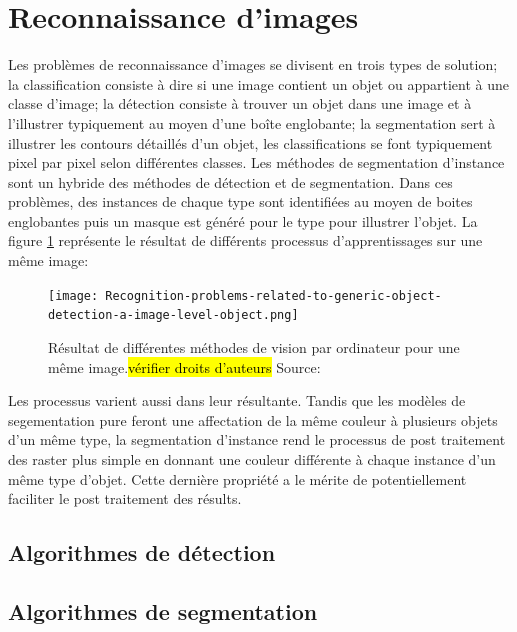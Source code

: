 \section{Reconnaissance d'images}
Les problèmes de reconnaissance d'images se divisent en trois types de solution; la classification consiste à dire si une image contient un objet ou appartient à une classe d'image; la détection consiste à trouver un objet dans une image et à l'illustrer typiquement au moyen d'une boîte englobante; la segmentation sert à illustrer les contours détaillés d'un objet, les classifications se font typiquement pixel par pixel selon différentes classes. Les méthodes de segmentation d'instance sont un hybride des méthodes de détection et de segmentation. Dans ces problèmes, des instances de chaque type sont identifiées au moyen de boites englobantes puis un masque est généré pour le type pour illustrer l'objet. La figure \ref{fig:computer_vision_problems} représente le résultat de différents processus d'apprentissages sur une même image:

\begin{figure}
  \centering
  \texttt{[image: Recognition-problems-related-to-generic-object-detection-a-image-level-object.png]}
  \caption{Résultat de différentes méthodes de vision par ordinateur pour une même image.\hl{vérifier droits d'auteurs} Source: \cite{Minaee:ImageSegmentation:2022}}
  \label{fig:computer_vision_problems}
\end{figure}
Les processus varient aussi dans leur résultante. Tandis que les modèles de segementation pure feront une affectation de la même couleur à plusieurs objets d'un même type, la segmentation d'instance rend le processus de post traitement des raster plus simple en donnant une couleur différente à chaque instance d'un même type d'objet. Cette dernière propriété a le mérite de potentiellement faciliter le post traitement des résults.
\FloatBarrier
\subsection{Algorithmes de détection}

\subsection{Algorithmes de segmentation}

